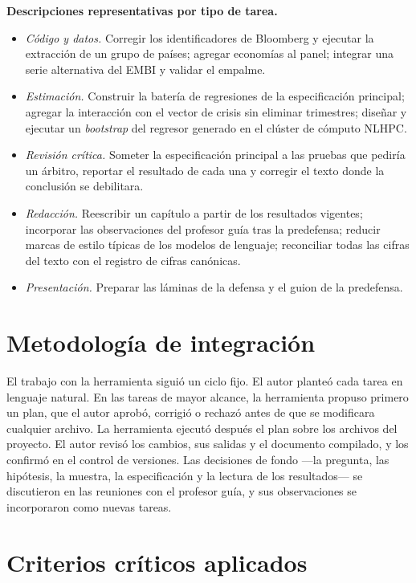 \textbf{Descripciones representativas por tipo de tarea.}
\begin{itemize}
    \item \emph{Código y datos.} Corregir los identificadores de Bloomberg y ejecutar la extracción de un grupo de países; agregar economías al panel; integrar una serie alternativa del EMBI y validar el empalme.
    \item \emph{Estimación.} Construir la batería de regresiones de la especificación principal; agregar la interacción con el vector de crisis sin eliminar trimestres; diseñar y ejecutar un \textit{bootstrap} del regresor generado en el clúster de cómputo NLHPC.
    \item \emph{Revisión crítica.} Someter la especificación principal a las pruebas que pediría un árbitro, reportar el resultado de cada una y corregir el texto donde la conclusión se debilitara.
    \item \emph{Redacción.} Reescribir un capítulo a partir de los resultados vigentes; incorporar las observaciones del profesor guía tras la predefensa; reducir marcas de estilo típicas de los modelos de lenguaje; reconciliar todas las cifras del texto con el registro de cifras canónicas.
    \item \emph{Presentación.} Preparar las láminas de la defensa y el guion de la predefensa.
\end{itemize}

\section{Metodología de integración}

El trabajo con la herramienta siguió un ciclo fijo. El autor planteó cada tarea en lenguaje natural. En las tareas de mayor alcance, la herramienta propuso primero un plan, que el autor aprobó, corrigió o rechazó antes de que se modificara cualquier archivo. La herramienta ejecutó después el plan sobre los archivos del proyecto. El autor revisó los cambios, sus salidas y el documento compilado, y los confirmó en el control de versiones. Las decisiones de fondo ---la pregunta, las hipótesis, la muestra, la especificación y la lectura de los resultados--- se discutieron en las reuniones con el profesor guía, y sus observaciones se incorporaron como nuevas tareas.

\section{Criterios críticos aplicados}

